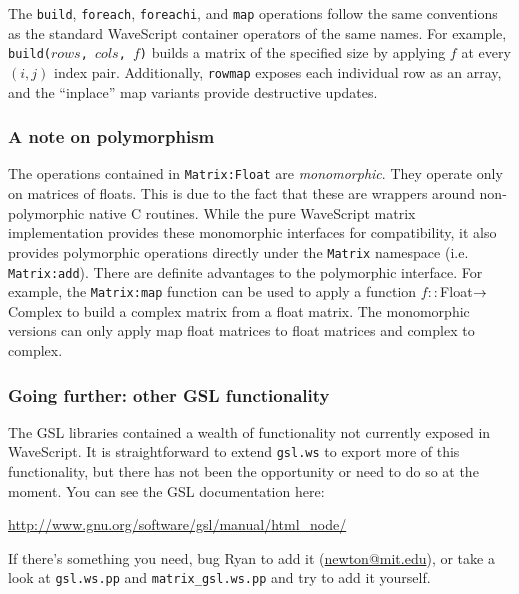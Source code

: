The {\tt build}, {\tt foreach}, {\tt foreachi}, and {\tt map}
operations follow the same conventions as the standard WaveScript
container operators of the same names.  For example, {\tt
build($rows$, $cols$, $f$)} builds a matrix of the specified size by
applying $f$ at every $(i,j)$ index pair.  Additionally, {\tt rowmap}
exposes each individual row as an array, and the ``inplace'' map
variants provide destructive updates.

\subsubsection{A note on polymorphism}

The operations contained in {\tt Matrix:Float} are {\em monomorphic}.
They operate only on matrices of floats.  This is due to the fact that
these are wrappers around non-polymorphic native C routines.  While
the pure WaveScript matrix implementation provides these monomorphic
interfaces for compatibility, it also provides polymorphic operations
directly under the {\tt Matrix} namespace (i.e. {\tt Matrix:add}).
There are definite advantages to the polymorphic interface.  For
example, the {\tt Matrix:map} function can be used to apply a function
$f :: $Float$ \rightarrow $Complex to build a complex matrix from a float
matrix.  The monomorphic versions can only apply map float matrices to
float matrices and complex to complex.

\subsubsection{Going further: other GSL functionality}

The GSL libraries contained a wealth of functionality not currently
exposed in WaveScript.  It is straightforward to extend {\tt gsl.ws}
to export more of this functionality, but there has not been the
opportunity or need to do so at the moment.  You can see the GSL
documentation here:

\vspace{-2mm}
\begin{center}
\url{http://www.gnu.org/software/gsl/manual/html_node/}
\end{center}

If there's something you need, bug Ryan to add
it (\url{newton@mit.edu}), or take a look at {\tt gsl.ws.pp} and {\tt matrix\_gsl.ws.pp} and
try to add it yourself.


